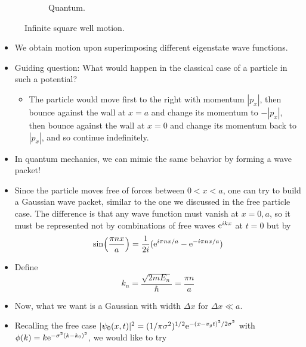 \documentclass[../notes.tex]{subfiles}
\begin{document}
\begin{itemize}
\begin{figure}[h!]
\begin{subfigure}[b]{0.25\linewidth}
            \caption{Quantum.}
            \label{fig:infWellMotionb}
        \end{subfigure}
        \caption{Infinite square well motion.}
        \label{fig:infWellMotion}
    \end{figure}
    \begin{itemize}
        \item We obtain motion upon superimposing different eigenstate wave functions.
        \item Guiding question: What would happen in the classical case of a particle in such a potential?
        \begin{itemize}
            \item The particle would move first to the right with momentum $|p_x|$, then bounce against the wall at $x=a$ and change its momentum to $-|p_x|$, then bounce against the wall at $x=0$ and change its momentum back to $|p_x|$, and so continue indefinitely.
        \end{itemize}
        \item In quantum mechanics, we can mimic the same behavior by forming a wave packet!
        \item Since the particle moves free of forces between $0<x<a$, one can try to build a Gaussian wave packet, similar to the one we discussed in the free particle case. The difference is that any wave function must vanish at $x=0,a$, so it must be represented not by combinations of free waves $\e[ikx]$ at $t=0$ but by
        \begin{equation*}
            \sin(\frac{\pi nx}{a}) = \frac{1}{2i}(\e[i\pi nx/a]-\e[-i\pi nx/a])
        \end{equation*}
        \item Define
        \begin{equation*}
            k_n = \frac{\sqrt{2mE_n}}{\hbar}
            = \frac{\pi n}{a}
        \end{equation*}
        \item Now, what we want is a Gaussian with width $\Delta x$ for $\Delta x\ll a$.
        \item Recalling the free case $|\psi_0(x,t)|^2=(1/\pi\sigma^2)^{1/2}\e[-(x-v_gt)^2/2\sigma^2]$ with $\phi(k)=k\e[-\sigma^2(k-k_0)^2]$, we would like to try
        \begin{equation*}

\end{equation*}
\end{itemize}
\end{itemize}
\end{document}
